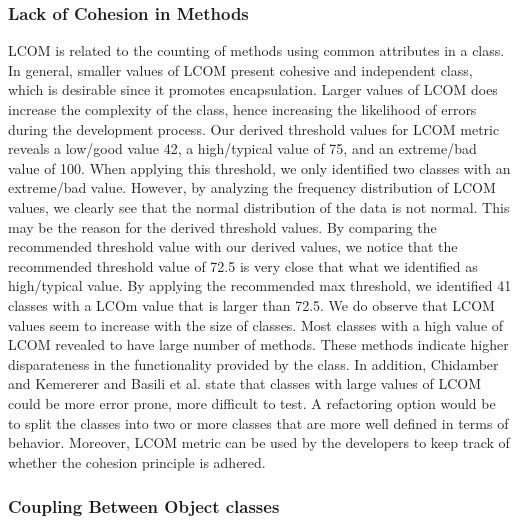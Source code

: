 \subsubsection{Lack of Cohesion in Methods}


LCOM is related to the counting of methods using common attributes in a class. In general, smaller values of LCOM present cohesive and independent class, which is desirable since it promotes encapsulation. Larger values of LCOM does increase the complexity of the class, hence increasing the likelihood of errors during the development process. Our derived threshold values for LCOM metric reveals a low/good value 42, a high/typical value of 75, and an extreme/bad value of 100. When applying this threshold, we only identified two classes with an extreme/bad value. However, by analyzing the frequency distribution of LCOM values, we clearly see that the normal distribution of the data is not normal. This may be the reason for the derived threshold values. By comparing the recommended threshold value with our derived values, we notice that the recommended threshold value of 72.5 is very close that what we identified as high/typical value. By applying the recommended max threshold, we identified 41 classes with a LCOm value that is larger than 72.5. We do observe that LCOM values seem to increase with the size of classes. Most classes with a high value of LCOM revealed to have large number of methods. These methods indicate higher disparateness in the functionality provided by the class. In addition, Chidamber and Kemererer\cite{chidamber1994metrics} and Basili et al.\cite{basili1996validation} state that classes with large values of LCOM could be more error prone, more difficult to test. A refactoring option would be to split the classes into two or more classes that are more well defined in terms of behavior. Moreover, LCOM metric can be used by the developers to keep track of whether the cohesion principle is adhered.


\subsubsection{Coupling Between Object classes}

